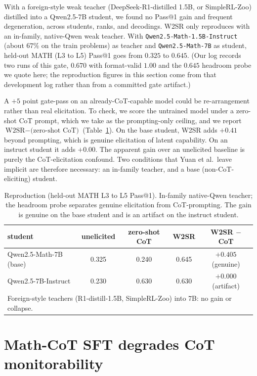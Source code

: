 \documentclass{article}
\begin{document}
With a foreign-style weak teacher (DeepSeek-R1-distilled 1.5B, or
SimpleRL-Zoo) distilled into a Qwen2.5-7B student, we found no Pass@1 gain and
frequent degeneration, across students, ranks, and decodings. W2SR only
reproduces with an in-family, native-Qwen weak teacher. With
\texttt{Qwen2.5-Math-1.5B-Instruct} (about $67\%$ on the train problems) as
teacher and \texttt{Qwen2.5-Math-7B} as student, held-out MATH (L3 to L5)
Pass@1 goes from $0.325$ to $0.645$. (Our log records two runs of this gate,
$0.670$ with format-valid $1.00$ and the $0.645$ headroom probe we quote here;
the reproduction figures in this section come from that development log rather
than from a committed gate artifact.)

A $+5$ point gate-pass on an already-CoT-capable model could be re-arrangement
rather than real elicitation. To check, we score the untrained model under a
zero-shot CoT prompt, which we take as the prompting-only ceiling, and we
report $\text{W2SR} - \text{(zero-shot CoT)}$ (Table~\ref{tab:repro}). On the
base student, W2SR adds $+0.41$ beyond prompting, which is genuine elicitation
of latent capability. On an instruct student it adds $+0.00$. The apparent gain
over an unelicited baseline is purely the CoT-elicitation confound. Two
conditions that Yuan et al.\ leave implicit are therefore necessary: an
in-family teacher, and a base (non-CoT-eliciting) student.

\begin{table}[t]
\centering\small
\caption{Reproduction (held-out MATH L3 to L5 Pass@1). In-family native-Qwen
teacher; the headroom probe separates genuine elicitation from CoT-prompting.
The gain is genuine on the base student and is an artifact on the instruct
student.}
\label{tab:repro}
\begin{tabular}{lcccc}
\toprule
student & unelicited & zero-shot CoT & W2SR & W2SR $-$ CoT \\
\midrule
Qwen2.5-Math-7B (base) & 0.325 & 0.240 & 0.645 & $+0.405$ (genuine)\\
Qwen2.5-7B-Instruct & 0.230 & 0.630 & 0.630 & $+0.000$ (artifact)\\
\midrule
\multicolumn{5}{l}{\footnotesize Foreign-style teachers (R1-distill-1.5B, SimpleRL-Zoo) into 7B: no gain or collapse.}\\
\bottomrule
\end{tabular}
\end{table}

\section{Math-CoT SFT degrades CoT monitorability}
\label{sec:ext}
\end{document}
